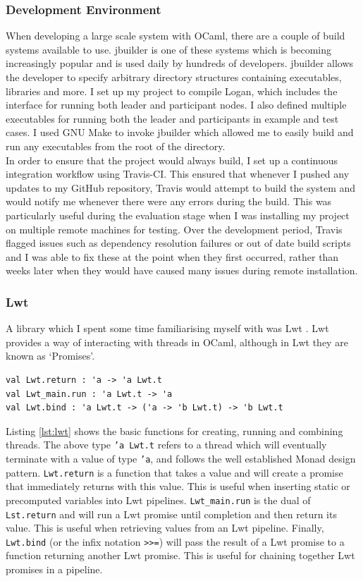 \documentclass[12pt,a4paper,twoside,openright]{report}
\begin{document}
	\subsubsection*{Development Environment}
	When developing a large scale system with OCaml, there are a couple of build systems available to use. 
	jbuilder \cite{jbuilder} is one of these systems which is becoming increasingly popular and is used daily by hundreds of developers.
	jbuilder allows the developer to specify arbitrary directory structures containing executables, libraries and more.
	I set up my project to compile Logan, which includes the interface for running both leader and participant nodes. 
	I also defined multiple executables for running both the leader and participants in example and test cases. 
	I used GNU Make \cite{GNUMake} to invoke jbuilder which allowed me to easily build and run any executables from the root of the directory.\\
	
	In order to ensure that the project would always build, I set up a continuous integration workflow using Travis-CI. 
	This ensured that whenever I pushed any updates to my GitHub repository, Travis would attempt to build the system and would notify me whenever there were any errors during the build.
	This was particularly useful during the evaluation stage when I was installing my project on multiple remote machines for testing.
	Over the development period, Travis flagged issues such as dependency resolution failures or out of date build scripts and I was able to fix these at the point when they first occurred, rather than weeks later when they would have caused many issues during remote installation.

	\subsubsection*{Lwt}
	A library which I spent some time familiarising myself with was Lwt \cite{Lwt}. 
	Lwt provides a way of interacting with threads in OCaml, although in Lwt they are known as `Promises'.
	\begin{lstlisting}[caption={Lwt Promises},label={lst:lwt}]
val Lwt.return : 'a -> 'a Lwt.t 
val Lwt_main.run : 'a Lwt.t -> 'a
val Lwt.bind : 'a Lwt.t -> ('a -> 'b Lwt.t) -> 'b Lwt.t
	\end{lstlisting}
	Listing \ref{lst:lwt} shows the basic functions for creating, running and combining threads.
	The above type \texttt{'a Lwt.t} refers to a thread which will eventually terminate with a value of type \texttt{'a}, and follows the well established Monad design pattern.
	\texttt{Lwt.return} is a function that takes a value and will create a promise that immediately returns with this value.
	This is useful when inserting static or precomputed variables into Lwt pipelines.
	\texttt{Lwt\_main.run} is the dual of \texttt{Lst.return} and will run a Lwt promise until completion and then return its value.
	This is useful when retrieving values from an Lwt pipeline.
	Finally, \texttt{Lwt.bind} (or the infix notation \texttt{>>=}) will pass the result of a Lwt promise to a function returning another Lwt promise.
	This is useful for chaining together Lwt promises in a pipeline.
\end{document}
